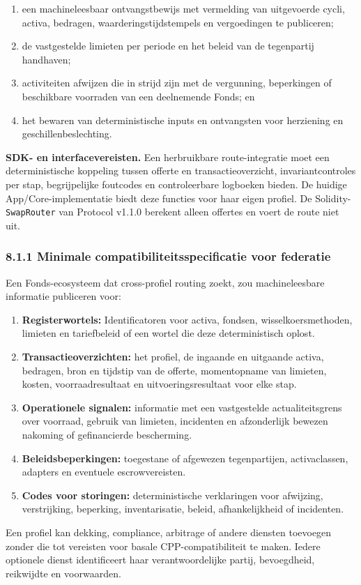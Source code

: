\documentclass[11pt]{article}
\begin{document}
\begin{enumerate}[leftmargin=*]
\item een machineleesbaar ontvangstbewijs met vermelding van uitgevoerde cycli, activa, bedragen, waarderingstijdstempels en vergoedingen te publiceren;
\item de vastgestelde limieten per periode en het beleid van de tegenpartij handhaven;
\item activiteiten afwijzen die in strijd zijn met de vergunning, beperkingen of beschikbare voorraden van een deelnemende Fonds; en
\item het bewaren van deterministische inputs en ontvangsten voor herziening en geschillenbeslechting.
\end{enumerate}
\textbf{SDK- en interfacevereisten.} Een herbruikbare route-integratie moet een deterministische koppeling tussen offerte en transactieoverzicht, invariantcontroles per stap, begrijpelijke foutcodes en controleerbare logboeken bieden. De huidige App/Core-implementatie biedt deze functies voor haar eigen profiel. De Solidity-\texttt{SwapRouter} van Protocol v1.1.0 berekent alleen offertes en voert de route niet uit.

\subsubsection*{8.1.1 Minimale compatibiliteitsspecificatie voor federatie}

Een Fonds-ecosysteem dat cross-profiel routing zoekt, zou machineleesbare informatie publiceren voor:

\begin{enumerate}[leftmargin=*]
\item \textbf{Registerwortels:} Identificatoren voor activa, fondsen, wisselkoersmethoden, limieten en tariefbeleid of een wortel die deze deterministisch oplost.
\item \textbf{Transactieoverzichten:} het profiel, de ingaande en uitgaande activa, bedragen, bron en tijdstip van de offerte, momentopname van limieten, kosten, voorraadresultaat en uitvoeringsresultaat voor elke stap.
\item \textbf{Operationele signalen:} informatie met een vastgestelde actualiteitsgrens over voorraad, gebruik van limieten, incidenten en afzonderlijk bewezen nakoming of gefinancierde bescherming.
\item \textbf{Beleidsbeperkingen:} toegestane of afgewezen tegenpartijen, activaclassen, adapters en eventuele escrowvereisten.
\item \textbf{Codes voor storingen:} deterministische verklaringen voor afwijzing, verstrijking, beperking, inventarisatie, beleid, afhankelijkheid of incidenten.
\end{enumerate}
Een profiel kan dekking, compliance, arbitrage of andere diensten toevoegen zonder die tot vereisten voor basale CPP-compatibiliteit te maken. Iedere optionele dienst identificeert haar verantwoordelijke partij, bevoegdheid, reikwijdte en voorwaarden.
\end{document}

